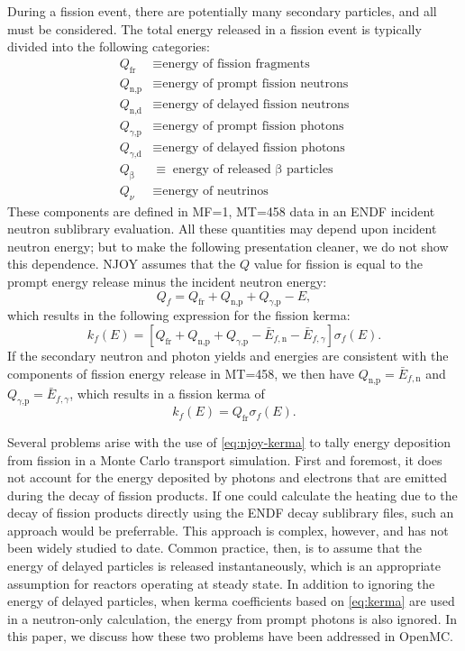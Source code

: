 \documentclass{anstrans}
\newcommand{\efr}{Q_\text{fr}}
\newcommand{\enp}{Q_\text{n,p}}
\newcommand{\ened}{Q_\text{n,d}}
\newcommand{\egp}{Q_\text{$\gamma$,p}}
\newcommand{\egd}{Q_\text{$\gamma$,d}}
\newcommand{\eb}{Q_\upbeta}
\newcommand{\enu}{Q_\nu}
\begin{document}
During a fission event, there are potentially many secondary particles, and all
must be considered. The total energy released in a fission event is typically
divided into the following categories:
\begin{equation*}
\begin{split}
  \efr  &\equiv \text{energy of fission fragments} \\
  \enp  &\equiv \text{energy of prompt fission neutrons} \\
  \ened &\equiv \text{energy of delayed fission neutrons} \\
  \egp  &\equiv \text{energy of prompt fission photons} \\
  \egd  &\equiv \text{energy of delayed fission photons} \\
  \eb   &\equiv \text{energy of released $\upbeta$ particles} \\
  \enu  &\equiv \text{energy of neutrinos}
\end{split}
\end{equation*}
These components are defined in MF=1, MT=458 data in an ENDF incident neutron
sublibrary evaluation. All these quantities may depend upon incident neutron
energy; but to make the following presentation cleaner, we do not show this
dependence. NJOY assumes that the $Q$ value for fission is equal to the prompt
energy release minus the incident neutron energy:
\begin{equation}
    \label{eq:njoy-fissq}
    Q_f = \efr + \enp + \egp - E,
\end{equation}
which results in the following expression for the fission kerma:
\begin{equation}
    k_f(E) = \left[\efr + \enp + \egp - \bar{E}_{f,\text{n}} - \bar{E}_{f,\gamma}\right]\sigma_f(E).
\end{equation}
If the secondary neutron and photon yields and energies are consistent with the
components of fission energy release in MT=458, we then have $\enp =
\bar{E}_{f,\text{n}}$ and $\egp = \bar{E}_{f,\gamma}$, which results in a
fission kerma of
\begin{equation}
    \label{eq:njoy-kerma}
    k_f(E) = \efr \sigma_f(E).
\end{equation}

Several problems arise with the use of \cref{eq:njoy-kerma} to tally energy
deposition from fission in a Monte Carlo transport simulation. First and
foremost, it does not account for the energy deposited by photons and electrons
that are emitted during the decay of fission products. If one could
calculate the heating due to the decay of fission products directly using the
ENDF decay sublibrary files, such an approach would be preferrable.
This approach is complex, however, and has not been widely studied to date.
Common
practice, then, is to assume that the energy of delayed particles is released
instantaneously, which is an appropriate assumption for reactors operating at
steady state. In addition to ignoring the energy of delayed particles, when
kerma coefficients based on \cref{eq:kerma} are used in a neutron-only
calculation, the energy from prompt photons is also ignored. In this paper, we
discuss how these two problems have been addressed in OpenMC.
\end{document}

